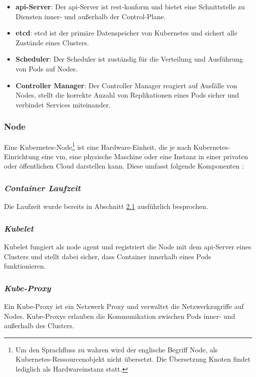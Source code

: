 \begin{itemize}
  \item \textbf{\acs{api}-Server}: Der \acs{api}-Server ist \acs{rest}-konform und bietet eine Schnittstelle zu Diensten
  inner- und außerhalb der Control-Plane.
  \item \textbf{etcd}: etcd ist der primäre Datenspeicher von Kubernetes und sichert alle Zustände eines Clusters.
  \item \textbf{Scheduler}: Der Scheduler ist zuständig für die Verteilung und Ausführung von Pods auf Nodes.
  \item \textbf{Controller Manager}: Der Controller Manager reagiert auf Ausfälle von Nodes, stellt die korrekte Anzahl von Replikationen eines Pods sicher und verbindet Services miteinander.
\end{itemize}

\subsubsection{Node}
Eine Kubernetes-Node\footnote{Um den Sprachfluss zu wahren wird der englische Begriff Node, als Kubernetes-Ressourcenobjekt nicht übersetzt. 
Die Übersetzung Knoten findet lediglich als Hardwareinstanz statt.} 
ist eine Hardware-Einheit, die je nach Kubernetes-Einrichtung eine \acs{vm}, eine physische Maschine oder 
eine Instanz in einer privaten oder öffentlichen Cloud darstellen kann.
Diese umfasst folgende Komponenten \cite{kubernetesnodes}:

\subsubsection{\textit{Container Laufzeit}}
Die Laufzeit wurde bereits in Abschnitt \hyperref[Docker]{2.1} ausführlich besprochen.

\subsubsection{\textit{Kubelet}}
Kubelet fungiert als \glqq node agent\grqq{} und registriert die Node mit dem
\acs{api}-Server eines Clusters und stellt dabei sicher, dass Container innerhalb eines Pods
funktionieren.

\subsubsection{\textit{Kube-Proxy}}
Ein Kube-Proxy ist ein Netzwerk Proxy und verwaltet die Netzwerkzugriffe auf Nodes.
Kube-Proxys erlauben die Kommunikation zwischen Pods inner- und außerhalb des Clusters.

